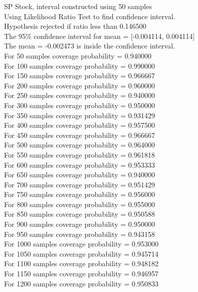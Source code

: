 \documentclass{article}
\begin{document}
SP Stock, interval constructed using 50 samples\\
Using Likelihood Ratio Test to find confidence interval.\\
Hypothesis rejected if ratio less than 0.146500\\
The 95\% confidence interval for mean = [-0.004114, 0.004114]\\
The mean = -0.002473 is inside the confidence interval.\\
For 50 samples coverage probability = 0.940000\\
For 100 samples coverage probability = 0.990000\\
For 150 samples coverage probability = 0.966667\\
For 200 samples coverage probability = 0.960000\\
For 250 samples coverage probability = 0.940000\\
For 300 samples coverage probability = 0.950000\\
For 350 samples coverage probability = 0.931429\\
For 400 samples coverage probability = 0.957500\\
For 450 samples coverage probability = 0.966667\\
For 500 samples coverage probability = 0.964000\\
For 550 samples coverage probability = 0.961818\\
For 600 samples coverage probability = 0.953333\\
For 650 samples coverage probability = 0.940000\\
For 700 samples coverage probability = 0.951429\\
For 750 samples coverage probability = 0.956000\\
For 800 samples coverage probability = 0.955000\\
For 850 samples coverage probability = 0.950588\\
For 900 samples coverage probability = 0.950000\\
For 950 samples coverage probability = 0.943158\\
For 1000 samples coverage probability = 0.953000\\
For 1050 samples coverage probability = 0.945714\\
For 1100 samples coverage probability = 0.948182\\
For 1150 samples coverage probability = 0.946957\\
For 1200 samples coverage probability = 0.950833\\
\end{document}
